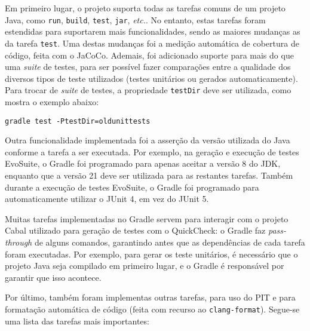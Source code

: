 \documentclass[12pt, a4paper]{article}
\begin{document}
Em primeiro lugar, o projeto suporta todas as tarefas comuns de um projeto Java, como \texttt{run},
\texttt{build}, \texttt{test}, \texttt{jar}, \emph{etc.}. No entanto, estas tarefas foram estendidas
para suportarem mais funcionalidades, sendo as maiores mudanças as da tarefa \texttt{test}. Uma
destas mudanças foi a medição automática de cobertura de código, feita com o JaCoCo. Ademais, foi
adicionado suporte para mais do que uma \emph{suite} de testes, para ser possível fazer comparações
entre a qualidade dos diversos tipos de teste utilizados (testes unitários ou gerados
automaticamente). Para trocar de \emph{suite} de testes, a propriedade \texttt{testDir} deve ser
utilizada, como mostra o exemplo abaixo:

\begin{center}
    \texttt{gradle test -PtestDir=oldunittests}
\end{center}

Outra funcionalidade implementada foi a asserção da versão utilizada do Java conforme a tarefa a
ser executada. Por exemplo, na geração e execução de testes EvoSuite, o Gradle foi programado para
apenas aceitar a versão 8 do JDK, enquanto que a versão 21 deve ser utilizada para as restantes
tarefas. Também durante a execução de testes EvoSuite, o Gradle foi programado para automaticamente
utilizar o JUnit 4, em vez do JUnit 5.

Muitas tarefas implementadas no Gradle servem para interagir com o projeto Cabal utilizado para
geração de testes com o QuickCheck: o Gradle faz \emph{pass-through} de alguns comandos, garantindo
antes que as dependências de cada tarefa foram executadas. Por exemplo, para gerar os teste
unitários, é necessário que o projeto Java seja compilado em primeiro lugar, e o Gradle é
responsável por garantir que isso acontece.

Por último, também foram implementas outras tarefas, para uso do PIT e para formatação automática
de código (feita com recurso ao \texttt{clang-format}). Segue-se uma lista das tarefas mais
importantes:
\end{document}
